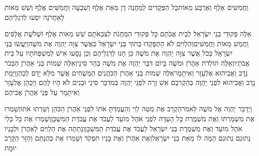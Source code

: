 \documentclass[../main/main.tex]{subfiles}
\begin{document}
\begin{multicols}{\ncols}
וַחֲמִשִּׁים אֶלֶף וְאַרְבַּע מֵאוֹת\PreVerseSpace{}כָּל הַפְּקֻדִים לְמַחֲנֵה דָן מְאַת אֶלֶף וְשִׁבְעָה וַחֲמִשִּׁים אֶלֶף וְשֵׁשׁ מֵאוֹת לָאַחֲרֹנָה יִסְעוּ לְדִגְלֵיהֶם\OpenSection{}\par
{}אֵלֶּה פְּקוּדֵי בְנֵי יִשְׂרָאֵל לְבֵית אֲבֹתָם כָּל פְּקוּדֵי הַמַּחֲנֹת לְצִבְאֹתָם שֵׁשׁ מֵאוֹת אֶלֶף וּשְׁלֹשֶׁת אֲלָפִים וַחֲמֵשׁ מֵאוֹת וַחֲמִשִּׁים\PreVerseSpace{}וְהַלְוִיִּם לֹא הָתְפָּקְדוּ בְּתוֹךְ בְּנֵי יִשְׂרָאֵל כַּאֲשֶׁר צִוָּה יַהְוֶה אֶת מֹשֶׁה\PreVerseSpace{}וַיַּעֲשׂוּ בְּנֵי יִשְׂרָאֵל כְּכֹל אֲשֶׁר צִוָּה יַהְוֶה אֶת מֹשֶׁה כֵּן חָנוּ לְדִגְלֵיהֶם וְכֵן נָסָעוּ אִישׁ לְמִשְׁפְּחֹתָיו עַל בֵּית אֲבֹתָיו\PreChapterSpace{}וְאֵלֶּה תּוֹלְדֹת אַהֲרֹן וּמֹשֶׁה בְּיוֹם דִּבֶּר יַהְוֶה אֶת מֹשֶׁה בְּהַר סִינָי\PreVerseSpace{}וְאֵלֶּה שְׁמוֹת בְּנֵי אַהֲרֹן הַבְּכֹר נָדָב וַאֲבִיהוּא אֶלְעָזָר וְאִיתָמָר\PreVerseSpace{}אֵלֶּה שְׁמוֹת בְּנֵי אַהֲרֹן הַכֹּהֲנִים הַמְּשֻׁחִים אֲשֶׁר מִלֵּא יָדָם לְכַהֵן\PreVerseSpace{}וַיָּמָת נָדָב וַאֲבִיהוּא לִפְנֵי יַהְוֶה בְּהַקְרִבָם אֵשׁ זָרָה לִפְנֵי יַהְוֶה בְּמִדְבַּר סִינַי וּבָנִים לֹא הָיוּ לָהֶם וַיְכַהֵן אֶלְעָזָר וְאִיתָמָר עַל פְּנֵי אַהֲרֹן אֲבִיהֶם\OpenSection{}\par
{}וַיְדַבֵּר יַהְוֶה אֶל מֹשֶׁה לֵּאמֹר\PreVerseSpace{}הַקְרֵב אֶת מַטֵּה לֵוִי וְהַעֲמַדְתָּ אֹתוֹ לִפְנֵי אַהֲרֹן הַכֹּהֵן וְשֵׁרְתוּ אֹתוֹ\PreVerseSpace{}וְשָׁמְרוּ אֶת מִשְׁמַרְתּוֹ וְאֶת מִשְׁמֶרֶת כָּל הָעֵדָה לִפְנֵי אֹהֶל מוֹעֵד לַעֲבֹד אֶת עֲבֹדַת הַמִּשְׁכָּן\PreVerseSpace{}וְשָׁמְרוּ אֶת כָּל כְּלֵי אֹהֶל מוֹעֵד וְאֶת מִשְׁמֶרֶת בְּנֵי יִשְׂרָאֵל לַעֲבֹד אֶת עֲבֹדַת הַמִּשְׁכָּן\PreVerseSpace{}וְנָתַתָּה אֶת הַלְוִיִּם לְאַהֲרֹן וּלְבָנָיו נְתוּנִם נְתוּנִם הֵמָּה לוֹ מֵאֵת בְּנֵי יִשְׂרָאֵל\PreVerseSpace{}וְאֶת אַהֲרֹן וְאֶת בָּנָיו תִּפְקֹד וְשָׁמְרוּ אֶת כְּהֻנָּתָם וְהַזָּר הַקָּרֵב יוּמָת\OpenSection{}\par

\end{multicols}
\end{document}
